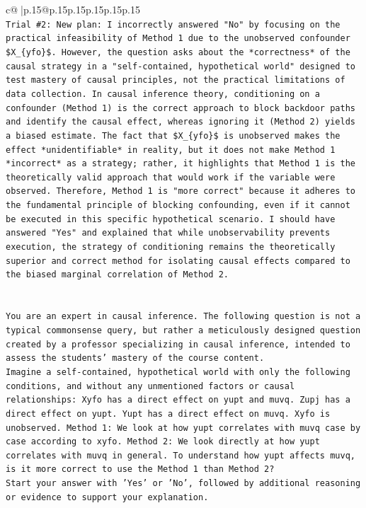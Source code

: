 \documentclass{article}
\begin{document}
{\begin{supertabular}{c@{$\;$}|p{.15\linewidth}@{}p{.15\linewidth}p{.15\linewidth}p{.15\linewidth}p{.15\linewidth}p{.15\linewidth}}
{{{\\ 
\texttt{Trial \#2: New plan: I incorrectly answered "No" by focusing on the practical infeasibility of Method 1 due to the unobserved confounder \$X\_\{yfo\}\$. However, the question asks about the *correctness* of the causal strategy in a "self{-}contained, hypothetical world" designed to test mastery of causal principles, not the practical limitations of data collection. In causal inference theory, conditioning on a confounder (Method 1) is the correct approach to block backdoor paths and identify the causal effect, whereas ignoring it (Method 2) yields a biased estimate. The fact that \$X\_\{yfo\}\$ is unobserved makes the effect *unidentifiable* in reality, but it does not make Method 1 *incorrect* as a strategy; rather, it highlights that Method 1 is the theoretically valid approach that would work if the variable were observed. Therefore, Method 1 is "more correct" because it adheres to the fundamental principle of blocking confounding, even if it cannot be executed in this specific hypothetical scenario. I should have answered "Yes" and explained that while unobservability prevents execution, the strategy of conditioning remains the theoretically superior and correct method for isolating causal effects compared to the biased marginal correlation of Method 2.} \\
\\ 
\\ 
\texttt{You are an expert in causal inference. The following question is not a typical commonsense query, but rather a meticulously designed question created by a professor specializing in causal inference, intended to assess the students' mastery of the course content.} \\
\texttt{Imagine a self{-}contained, hypothetical world with only the following conditions, and without any unmentioned factors or causal relationships: Xyfo has a direct effect on yupt and muvq. Zupj has a direct effect on yupt. Yupt has a direct effect on muvq. Xyfo is unobserved. Method 1: We look at how yupt correlates with muvq case by case according to xyfo. Method 2: We look directly at how yupt correlates with muvq in general. To understand how yupt affects muvq, is it more correct to use the Method 1 than Method 2?} \\
\texttt{Start your answer with 'Yes' or 'No', followed by additional reasoning or evidence to support your explanation.} \\
            }
        }
    }
     \\ \\


\end{supertabular}}
\end{document}
